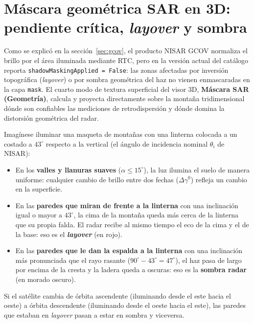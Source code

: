 \documentclass[11pt,a4paper]{article}
\begin{document}
\section{Máscara geométrica SAR en 3D: pendiente crítica, \emph{layover} y sombra}
\label{sec:relieve3d-mascara-sar}

Como se explicó en la sección~\ref{sec:gcov}, el producto NISAR GCOV normaliza el brillo por el área iluminada
mediante RTC, pero en la versión actual del catálogo reporta \texttt{shadowMaskingApplied = False}: las zonas
afectadas por inversión topográfica (\emph{layover}) o por sombra geométrica del haz no vienen enmascaradas en
la capa \texttt{mask}. El cuarto modo de textura superficial del visor 3D, \textbf{Máscara SAR (Geometría)},
calcula y proyecta directamente sobre la montaña tridimensional dónde son confiables las mediciones de
retrodispersión y dónde domina la distorsión geométrica del radar.

\begin{intuicion}
Imagínese iluminar una maqueta de montañas con una linterna colocada a un costado a $43^\circ$ respecto a la
vertical (el ángulo de incidencia nominal $\theta_i$ de NISAR):
\begin{itemize}
  \item En los \textbf{valles y llanuras suaves} ($\alpha \le 15^\circ$), la luz ilumina el suelo de manera
        uniforme: cualquier cambio de brillo entre dos fechas ($\Delta\gamma^0$) refleja un cambio en la
        superficie.
  \item En las \textbf{paredes que miran de frente a la linterna} con una inclinación igual o mayor a $43^\circ$,
        la cima de la montaña queda más cerca de la linterna que su propia falda. El radar recibe al mismo
        tiempo el eco de la cima y el de la base: eso es el \textbf{\emph{layover}} (en rojo).
  \item En las \textbf{paredes que le dan la espalda a la linterna} con una inclinación más pronunciada que el
        rayo rasante ($90^\circ - 43^\circ = 47^\circ$), el haz pasa de largo por encima de la cresta y la
        ladera queda a oscuras: eso es la \textbf{sombra radar} (en morado oscuro).
\end{itemize}
Si el satélite cambia de órbita ascendente (iluminando desde el este hacia el oeste) a órbita descendente
(iluminando desde el oeste hacia el este), las paredes que estaban en \emph{layover} pasan a estar en sombra y
viceversa.
\end{intuicion}
\end{document}
